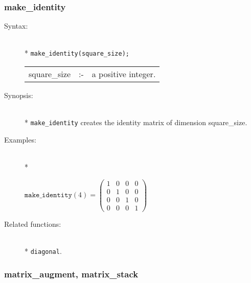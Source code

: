 \subsubsection{make\_identity}
\label{linalg:make_identity}

\begin{description}
\item[Syntax:]\mbox{}\\*
\texttt{make\_identity(square\_size);}\\[2mm]
\begin{tabular}{l l l}
square\_size &:-& a positive integer.
\end{tabular}

\item[Synopsis:]\mbox{}\\*
\texttt{make\_identity} creates the identity matrix of 
                dimension square\_size.

\item[Examples:]\mbox{}\\*
\begin{flushleft}  
\begin{math}  
\texttt{make\_identity}(4)  =  
        \begin{pmatrix} 1 & 0 & 0 & 0 \\ 0 & 1 & 0 & 0 \\
                        0 & 0 & 1 & 0 \\ 0 & 0 & 0 & 1
 \end{pmatrix}
\end{math}  
\end{flushleft}

\item[Related functions:]\mbox{}\\*
\texttt{diagonal}.
\end{description}


\subsubsection{matrix\_augment, matrix\_stack}
\label{linalg:matrix_augment}

